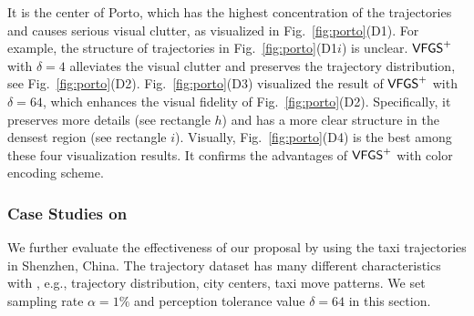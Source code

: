  It is the center of Porto, which has the highest concentration of the trajectories and causes serious visual clutter, as visualized in Fig.~\ref{fig:porto}(D1).
For example, the structure of trajectories in Fig.~\ref{fig:porto}(D1$i$) is unclear.
$\mathsf{VFGS}^{+}$ with $\delta=4$ alleviates the visual clutter and preserves the trajectory distribution, see Fig.~\ref{fig:porto}(D2).
Fig.~\ref{fig:porto}(D3) visualized the result of $\mathsf{VFGS}^{+}$ with $\delta=64$, which enhances the visual fidelity of Fig.~\ref{fig:porto}(D2).
Specifically, it preserves more details (see rectangle $h$) and has a more clear structure in the {densest} region (see rectangle $i$).
Visually, Fig.~\ref{fig:porto}(D4) is the best among these four visualization results.
It confirms the advantages of $\mathsf{VFGS}^{+}$ with color encoding scheme.





\subsubsection{Case Studies on \sz}\label{sec:sz}
We further evaluate the effectiveness of our proposal by using the taxi trajectories in Shenzhen, China.
The \sz{} trajectory dataset has many different characteristics with \pt{}, e.g., trajectory distribution, city centers, taxi move patterns.
We set sampling rate $\alpha=1\%$ and perception tolerance value $\delta = 64$ in this section.

